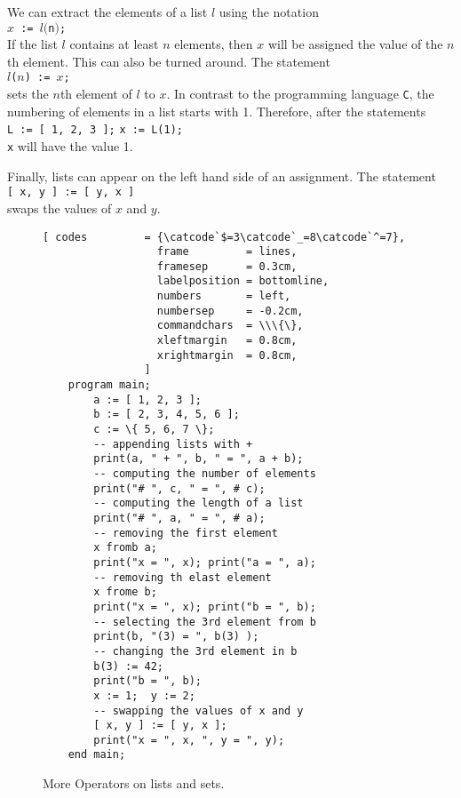 We can extract the elements of a list $l$ using the notation \\[0.2cm]
\hspace*{1.3cm} \texttt{$x$ := $l($n$)$;} \\[0.2cm]
If the list $l$ contains at least $n$ elements, then $x$ will be assigned the value of the
$n$th element.  This can also be turned around.  The statement
 \\[0.2cm]
\hspace*{1.3cm} \texttt{$l$($n$) := $x$;} \\[0.2cm]
sets the $n$th element of $l$ to $x$.  In contrast to the programming language \texttt{C},
the numbering of elements in a list starts with 1.
Therefore, after the statements
\\[0.2cm]
\hspace*{1.3cm} \texttt{L := [ 1, 2, 3 ];} \quad \texttt{x := L(1);}
\\[0.2cm]
\texttt{x} will have the value  1.

Finally, lists can appear on the left hand side of an assignment.  The statement
\\[0.2cm]
\hspace*{1.3cm}
\texttt{[ x, y ] := [ y, x ]}
\\[0.2cm]
swaps the values of $x$ and $y$.

\begin{figure}[!ht]
  \centering
\begin{Verbatim}[ codes         = {\catcode`$=3\catcode`_=8\catcode`^=7},
                  frame         = lines, 
                  framesep      = 0.3cm, 
                  labelposition = bottomline,
                  numbers       = left,
                  numbersep     = -0.2cm,
                  commandchars  = \\\{\},
                  xleftmargin   = 0.8cm,
                  xrightmargin  = 0.8cm,
                ]
    program main;
        a := [ 1, 2, 3 ];
        b := [ 2, 3, 4, 5, 6 ];
        c := \{ 5, 6, 7 \};
        -- appending lists with +
        print(a, " + ", b, " = ", a + b);
        -- computing the number of elements
        print("# ", c, " = ", # c);
        -- computing the length of a list
        print("# ", a, " = ", # a);
        -- removing the first element
        x fromb a;
        print("x = ", x); print("a = ", a);
        -- removing th elast element
        x frome b;
        print("x = ", x); print("b = ", b);
        -- selecting the 3rd element from b
        print(b, "(3) = ", b(3) );
        -- changing the 3rd element in b
        b(3) := 42;
        print("b = ", b);
        x := 1;  y := 2;
        -- swapping the values of x and y
        [ x, y ] := [ y, x ];
        print("x = ", x, ", y = ", y);
    end main;
\end{Verbatim} 
\vspace*{-0.3cm}
\caption{More Operators on lists and sets.}  \label{fig:simple-tuple.stl}
\end{figure} %

